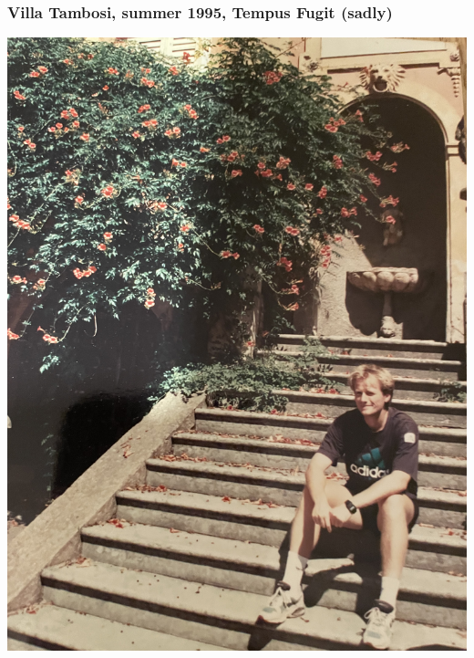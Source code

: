 \documentclass{beamer}
\begin{document}
\begin{frame}
\frametitle{Villa Tambosi, summer 1995, Tempus Fugit (sadly)}

\vspace{6mm}

\centerline{\includegraphics[width=0.8\linewidth]{Photos/mhj1995.jpeg}}

\vspace{6mm}
\end{frame}
\end{document}
